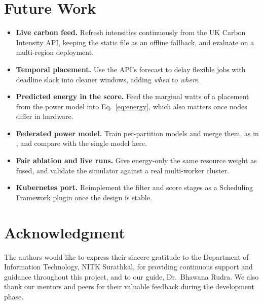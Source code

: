 \documentclass[conference]{IEEEtran}
\begin{document}
\section{Future Work}
\label{sec:future}
\begin{itemize}
\item \textbf{Live carbon feed.} Refresh intensities continuously from the UK Carbon Intensity API, keeping the static file as an offline fallback, and evaluate on a multi-region deployment.
\item \textbf{Temporal placement.} Use the API's forecast to delay flexible jobs with deadline slack into cleaner windows, adding \emph{when} to \emph{where}.
\item \textbf{Predicted energy in the score.} Feed the marginal watts of a placement from the power model into Eq.~\eqref{eq:energy}, which also matters once nodes differ in hardware.
\item \textbf{Federated power model.} Train per-partition models and merge them, as in \cite{saad2025}, and compare with the single model here.
\item \textbf{Fair ablation and live runs.} Give energy-only the same resource weight as fused, and validate the simulator against a real multi-worker cluster.
\item \textbf{Kubernetes port.} Reimplement the filter and score stages as a Scheduling Framework plugin once the design is stable.
\end{itemize}

\section*{Acknowledgment}
The authors would like to express their sincere gratitude to the Department of Information Technology, NITK Surathkal, for providing continuous support and guidance throughout this project, and to our guide, Dr.\ Bhawana Rudra. We also thank our mentors and peers for their valuable feedback during the development phase.
\end{document}
